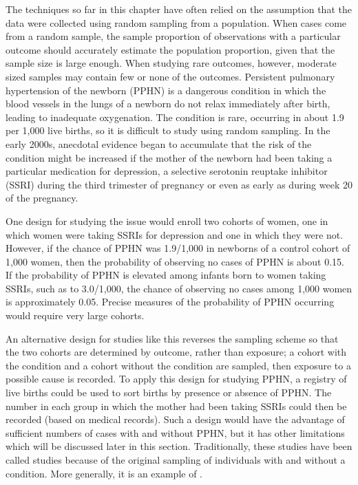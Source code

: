 The techniques so far in this chapter have often relied on the assumption that the data were collected using random sampling from a population.  When cases come from a random sample, the sample proportion of observations with a particular outcome should accurately estimate the population proportion, given that the sample size is large enough.  When studying rare outcomes, however, moderate sized samples may contain few or none of the outcomes.  Persistent pulmonary hypertension of the newborn (PPHN) is a dangerous condition in which the blood vessels in the lungs of a newborn do not relax immediately after birth, leading to inadequate oxygenation.   The condition is rare, occurring in about 1.9 per 1,000 live births, so it is difficult to study using random sampling.  In the early 2000s, anecdotal evidence began to accumulate that the risk of the condition might be increased if the mother of the newborn had been taking a particular medication for depression, a selective serotonin reuptake inhibitor (SSRI) during the third trimester of pregnancy or even as early as during week 20 of the pregnancy.  

One design for studying the issue would enroll two cohorts of women, one in which women were taking SSRIs for depression and one in which they were not. However, if the chance of PPHN was 1.9/1,000 in newborns of a control cohort of 1,000 women, then the probability of observing no cases of PPHN is about 0.15. If the probability of PPHN is elevated among infants born to women taking SSRIs, such as to 3.0/1,000, the chance of observing no cases among 1,000 women is approximately 0.05. Precise measures of the probability of PPHN occurring would require very large cohorts.

An alternative design for studies like this reverses the sampling scheme so that the two cohorts are determined by outcome, rather than exposure; a cohort with the condition and a cohort without the condition are sampled, then exposure to a possible cause is recorded. To apply this design for studying PPHN, a registry of live births could be used to sort births by presence or absence of PPHN. The number in each group in which the mother had been taking SSRIs could then be recorded (based on medical records). Such a design would have the advantage of sufficient numbers of cases with and without PPHN, but it has other limitations which will be discussed later in this section. Traditionally, these studies have been called  studies because of the original sampling of individuals with and without a condition.  More generally, it is an example of .

